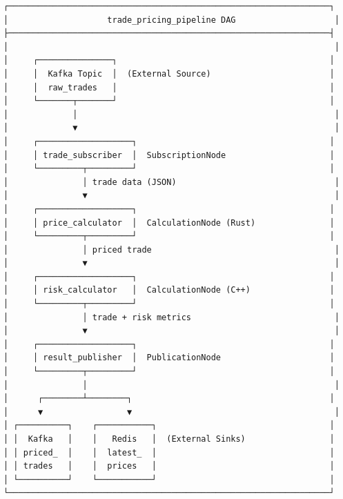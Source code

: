 \documentclass[
]{article}
\begin{document}
\begin{verbatim}
┌─────────────────────────────────────────────────────────────────┐
│                    trade_pricing_pipeline DAG                    │
├─────────────────────────────────────────────────────────────────┤
│                                                                  │
│     ┌───────────────┐                                           │
│     │  Kafka Topic  │  (External Source)                        │
│     │  raw_trades   │                                           │
│     └───────┬───────┘                                           │
│             │                                                    │
│             ▼                                                    │
│     ┌───────────────────┐                                       │
│     │ trade_subscriber  │  SubscriptionNode                     │
│     └─────────┬─────────┘                                       │
│               │ trade data (JSON)                                │
│               ▼                                                  │
│     ┌───────────────────┐                                       │
│     │ price_calculator  │  CalculationNode (Rust)               │
│     └─────────┬─────────┘                                       │
│               │ priced trade                                     │
│               ▼                                                  │
│     ┌───────────────────┐                                       │
│     │ risk_calculator   │  CalculationNode (C++)                │
│     └─────────┬─────────┘                                       │
│               │ trade + risk metrics                             │
│               ▼                                                  │
│     ┌───────────────────┐                                       │
│     │ result_publisher  │  PublicationNode                      │
│     └─────────┬─────────┘                                       │
│               │                                                  │
│      ┌────────┴────────┐                                        │
│      ▼                 ▼                                         │
│ ┌──────────┐    ┌───────────┐                                   │
│ │  Kafka   │    │   Redis   │  (External Sinks)                 │
│ │ priced_  │    │  latest_  │                                   │
│ │ trades   │    │  prices   │                                   │
│ └──────────┘    └───────────┘                                   │
└─────────────────────────────────────────────────────────────────┘
\end{verbatim}
\end{document}
